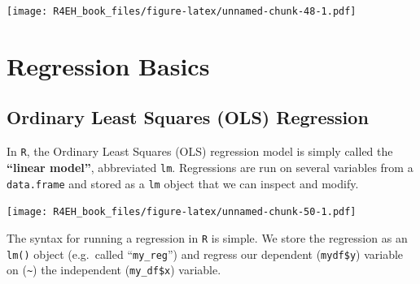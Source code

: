 \documentclass[]{book}
\newenvironment{Shaded}{\begin{snugshade}}{\end{snugshade}}
\newcommand{\KeywordTok}[1]{\textcolor[rgb]{0.13,0.29,0.53}{\textbf{#1}}}
\newcommand{\DataTypeTok}[1]{\textcolor[rgb]{0.13,0.29,0.53}{#1}}
\newcommand{\DecValTok}[1]{\textcolor[rgb]{0.00,0.00,0.81}{#1}}
\newcommand{\FloatTok}[1]{\textcolor[rgb]{0.00,0.00,0.81}{#1}}
\newcommand{\StringTok}[1]{\textcolor[rgb]{0.31,0.60,0.02}{#1}}
\newcommand{\CommentTok}[1]{\textcolor[rgb]{0.56,0.35,0.01}{\textit{#1}}}
\newcommand{\OperatorTok}[1]{\textcolor[rgb]{0.81,0.36,0.00}{\textbf{#1}}}
\newcommand{\NormalTok}[1]{#1}
\theoremstyle{definition}
\theoremstyle{definition}
\theoremstyle{definition}
\theoremstyle{remark}
\begin{document}
\texttt{[image: R4EH\_book\_files/figure-latex/unnamed-chunk-48-1.pdf]}

\chapter{Regression Basics}\label{regression-basics}

\section{Ordinary Least Squares (OLS)
Regression}\label{ordinary-least-squares-ols-regression}

In \texttt{R}, the Ordinary Least Squares (OLS) regression model is
simply called the \textbf{``linear model''}, abbreviated \texttt{lm}.
Regressions are run on several variables from a \texttt{data.frame} and
stored as a \texttt{lm} object that we can inspect and modify.

\begin{Shaded}
\end{Shaded}

\texttt{[image: R4EH\_book\_files/figure-latex/unnamed-chunk-50-1.pdf]}

The syntax for running a regression in \texttt{R} is simple. We store
the regression as an \texttt{lm()} object (e.g.~called
``\texttt{my\_reg}'') and regress our dependent (\texttt{mydf\$y})
variable on (\texttt{\textasciitilde{}}) the independent
(\texttt{my\_df\$x}) variable.
\end{document}
